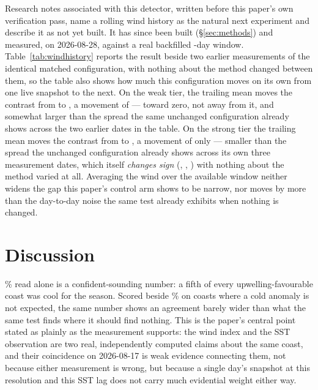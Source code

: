  Research notes
associated with this detector, written before this paper's own verification
pass, name a rolling wind history as the natural next experiment and
describe it as not yet built. It has since been built
(\S\ref{sec:methods}) and measured, on 2026-08-28, against a real backfilled
\WindHistoryActualWindowDays{}-day window. Table~\ref{tab:windhistory}
reports the result beside two earlier measurements of the identical matched
configuration, with nothing about the method changed between them, so the
table also shows how much this configuration moves on its own from one live
snapshot to the next. On the weak tier, the trailing mean moves the contrast
from \WindHistoryWeakInstant{} to \WindHistoryWeakTrailing{}, a movement of
\WindHistoryWeakMovement{} --- toward zero, not away from it, and somewhat
larger than the \WeakCrossDateSpread{} spread the same unchanged
configuration already shows across the two earlier dates in the table. On
the strong tier the trailing mean moves the contrast from
\WindHistoryStrongInstant{} to \WindHistoryStrongTrailing{}, a movement of
only \WindHistoryStrongMovement{} --- smaller than the
\StrongCrossDateSpread{} spread the unchanged configuration already shows
across its own three measurement dates, which itself \emph{changes sign}
(\MatchedStrongAugSeventeen{}, \MatchedStrongAugTwentyFive{},
\WindHistoryStrongInstant{}) with nothing about the method varied at all.
Averaging the wind over the available window neither widens the gap this
paper's control arm shows to be narrow, nor moves by more than the
day-to-day noise the same test already exhibits when nothing is changed.

\section{Discussion}
\label{sec:discussion}

\UpwellFavourWeak{}\% read alone is a confident-sounding number: a fifth of
every upwelling-favourable coast was cool for the season. Scored beside
\UpwellControlWeak{}\% on coasts where a cold anomaly is not expected, the
same number shows an agreement barely wider than what the same test finds
where it should find nothing. This is the paper's central point stated as
plainly as the measurement supports: the wind index and the SST observation
are two real, independently computed claims about the same coast, and their
coincidence on 2026-08-17 is weak evidence connecting them, not because
either measurement is wrong, but because a single day's snapshot at this
resolution and this SST lag does not carry much evidential weight either
way.

